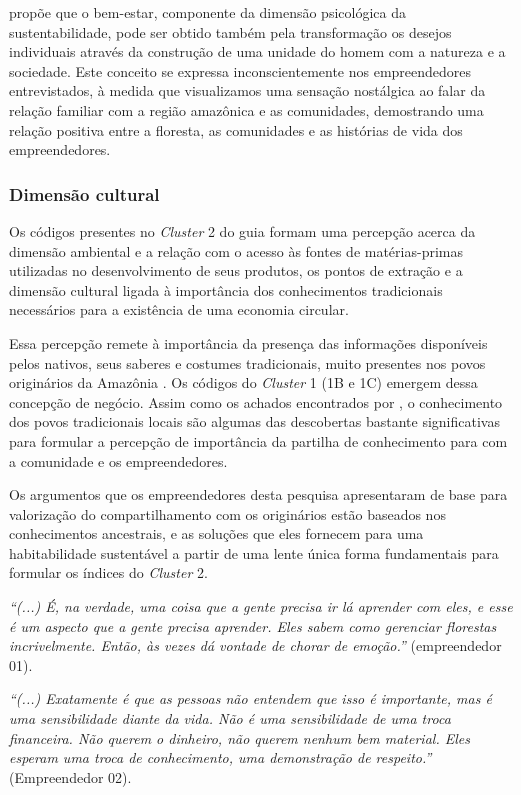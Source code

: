  propõe que o bem-estar, componente da dimensão psicológica da sustentabilidade, pode ser obtido também pela transformação os desejos individuais através da construção de uma unidade do homem com a natureza e a sociedade. Este conceito se expressa inconscientemente nos empreendedores entrevistados, à medida que visualizamos uma sensação nostálgica ao falar da relação familiar com a região amazônica e as comunidades, demostrando uma relação positiva entre a floresta, as comunidades e as histórias de vida dos empreendedores.  

\subsubsection*{Dimensão cultural}

Os códigos presentes no \textit{Cluster} 2 do guia formam uma percepção acerca da dimensão ambiental e a relação com o acesso às fontes de matérias-primas utilizadas no desenvolvimento de seus produtos, os pontos de extração e a dimensão cultural ligada à importância dos conhecimentos tradicionais necessários para a existência de uma economia circular. 

Essa percepção remete à importância da presença das informações disponíveis pelos nativos, seus saberes e costumes tradicionais, muito presentes nos povos originários da Amazônia \cite{Study2021TheChallenges}. Os códigos do \textit{Cluster} 1 (1B e 1C) emergem dessa concepção de negócio. Assim como os achados encontrados por \cite{Shafqat2022AdaptingPakistan}, o conhecimento dos povos tradicionais locais são algumas das descobertas bastante significativas para formular a percepção de importância da partilha de conhecimento para com a comunidade e os empreendedores. 

Os argumentos que os empreendedores desta pesquisa apresentaram de base para valorização do compartilhamento com os originários estão baseados nos conhecimentos ancestrais, e as soluções que eles fornecem para uma habitabilidade sustentável a partir de uma lente única forma fundamentais para formular os índices do \textit{Cluster} 2. 

\textit{“(...) É, na verdade, uma coisa que a gente precisa ir lá aprender com eles, e esse é um aspecto que a gente precisa aprender. Eles sabem como gerenciar florestas incrivelmente. Então, às vezes dá vontade de chorar de emoção.”} (empreendedor 01).

\textit{“(...) Exatamente é que as pessoas não entendem que isso é importante, mas é uma sensibilidade diante da vida. Não é uma sensibilidade de uma troca financeira. Não querem o dinheiro, não querem nenhum bem material. Eles esperam uma troca de conhecimento, uma demonstração de respeito.”} (Empreendedor 02).

